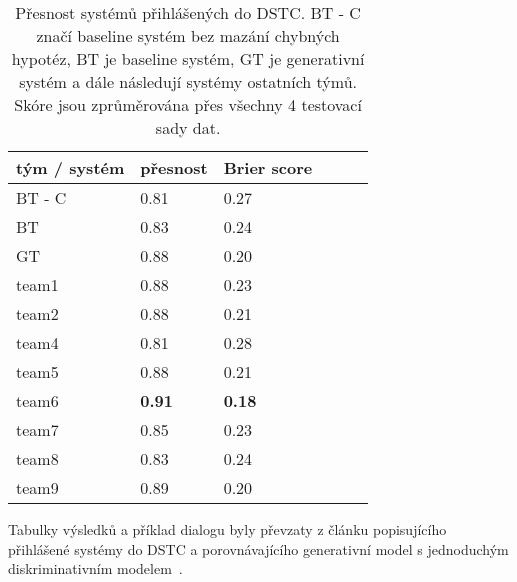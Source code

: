 \begin{table}[h]
\begin{center}
\begin{tabular}{|l|l|l|l|l|l|}
  \hline
tým / systém & přesnost & Brier score \\
\hline
BT - C         & 0.81 & 0.27\\
BT          & 0.83 & 0.24\\
GT          & 0.88 & 0.20\\
team1       & 0.88 & 0.23\\
team2       & 0.88 & 0.21\\
team4         & 0.81 & 0.28\\
team5         & 0.88 & 0.21\\
team6         & \textbf{0.91} & \textbf{0.18}\\
team7         & 0.85 & 0.23\\
team8         & 0.83 & 0.24\\
team9         & 0.89 & 0.20\\
\hline
\end{tabular}
\end{center}
\caption{Přesnost systémů přihlášených do DSTC. BT - C značí baseline systém bez mazání chybných hypotéz, BT je baseline systém, GT je generativní systém a dále následují systémy ostatních týmů. Skóre jsou zprůměrována přes všechny 4 testovací sady dat.}
\label{t:DSTC:ranking}
\end{table}

Tabulky výsledků a příklad dialogu byly převzaty z článku popisujícího přihlášené systémy do DSTC a porovnávajícího generativní model s jednoduchým diskriminativním modelem~\cite{zilka2013}.

